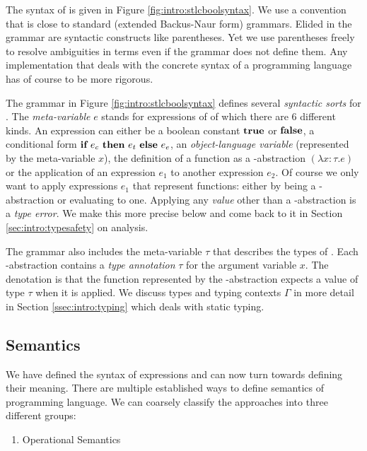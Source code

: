 {The syntax of \stlcbool is given in Figure \ref{fig:intro:stlcboolsyntax}. We
use a convention that is close to standard (extended Backus-Naur form) grammars. Elided in the
grammar are syntactic constructs like parentheses. Yet we use parentheses freely to
resolve ambiguities in terms even if the grammar does not define them. Any
implementation that deals with the concrete syntax of a programming language has
of course to be more rigorous.

The grammar in Figure \ref{fig:intro:stlcboolsyntax} defines several
\emph{syntactic sorts} for \stlcbool. The \emph{meta-variable} $e$ stands for
expressions of \stlcbool of which there are 6 different kinds. An expression can
either be a boolean constant $\textbf{true}$ or $\textbf{false}$, a conditional form
$\textbf{if}~{e_c}~\textbf{then}~{e_t}~\textbf{else}~{e_e}$, an \emph{object-language variable} (represented by the
meta-variable $x$), the definition of a function as a \textlambda-abstraction
$(\lambda x:\tau.e)$ or the application of an expression $e_1$ to another
expression $e_2$. Of course we only want to apply expressions $e_1$ that
represent functions: either by being a \textlambda-abstraction or evaluating to
one. Applying any \emph{value} other than a \textlambda-abstraction is a
\emph{type error}. We make this more precise below and come back to it in
Section \ref{sec:intro:typesafety} on analysis.

The grammar also includes the meta-variable $\tau$ that describes the types of
\stlcbool. Each \textlambda-abstraction contains a \emph{type annotation} $\tau$
for the argument variable $x$. The denotation is that the function represented
by the \textlambda-abstraction expects a value of type $\tau$ when it is
applied. We discuss types and typing contexts $\Gamma$ in more detail in Section
\ref{ssec:intro:typing} which deals with static typing.


\subsection{Semantics}\label{ssec:intro:semantics}

We have defined the syntax of \stlcbool expressions and can now turn towards
defining their meaning. There are multiple established ways to define semantics
of programming language. We can coarsely classify the approaches into three
different groups:

\begin{enumerate}
\item Operational Semantics


\end{enumerate}}
